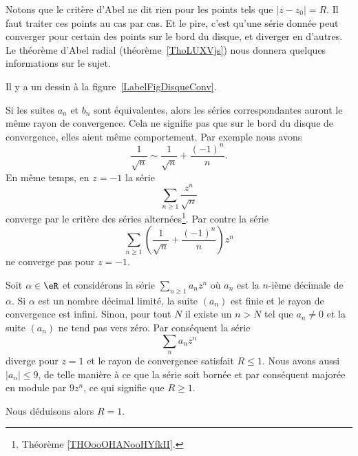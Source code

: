 Notons que le critère d'Abel ne dit rien pour les points tels que \( | z-z_0 |=R\). Il faut traiter ces points au cas par cas. Et le pire, c'est qu'une série donnée peut converger pour certain des points sur le bord du disque, et diverger en d'autres. Le théorème d'Abel radial (théorème~\ref{ThoLUXVjs}) nous donnera quelques informations sur le sujet.

Il y a un dessin à la figure~\ref{LabelFigDisqueConv}.
\newcommand{\CaptionFigDisqueConv}{À l'intérieur du disque de convergence, la convergence est absolue. En dehors, la série diverge. Sur le cercle proprement dit, tout peut arriver.}


Si les suites \( a_n\) et \( b_n\) sont équivalentes, alors les séries correspondantes auront le même rayon de convergence. Cela ne signifie pas que sur le bord du disque de convergence, elles aient même comportement. Par exemple nous avons
\begin{equation}
	\frac{1}{ \sqrt{n} }\sim \frac{1}{ \sqrt{n} }+\frac{ (-1)^n }{ n }.
\end{equation}
En même temps, en \( z=-1\) la série
\begin{equation}
	\sum_{n\geq 1}\frac{ z^n }{ \sqrt{n} }
\end{equation}
converge par le critère des séries alternées\footnote{Théorème \ref{THOooOHANooHYfkII}.}. Par contre la série
\begin{equation}
	\sum_{n\geq 1}\left( \frac{1}{ \sqrt{n} }+\frac{ (-1)^n }{ n } \right)z^n
\end{equation}
ne converge pas pour \( z=-1\).

\begin{example}
	Soit \( \alpha\in \eR\) et considérons la série \( \sum_{n\geq 1}a_nz^n\) où \( a_n\) est la \( n\)-ième décimale de \( \alpha\). Si \( \alpha\) est un nombre décimal limité, la suite \( (a_n)\) est finie et le rayon de convergence est infini. Sinon, pour tout \( N\) il existe un \( n>N\) tel que \( a_n\neq 0\) et la suite \( (a_n)\) ne tend pas vers zéro. Par conséquent la série
	\begin{equation}
		\sum_{n}a_nz^n
	\end{equation}
	diverge pour \( z=1\) et le rayon de convergence satisfait \( R\leq 1\). Nous avons aussi \( | a_n |\leq 9\), de telle manière à ce que la série soit bornée et par conséquent majorée en module par \( 9z^n\), ce qui signifie que \( R\geq 1\).

	Nous déduisons alors \( R=1\).
\end{example}


